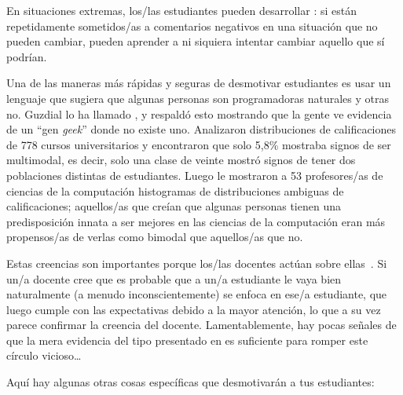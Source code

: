 En situaciones extremas,
los/las estudiantes pueden desarrollar :
si están repetidamente sometidos/as a comentarios negativos en una situación que no pueden cambiar,
pueden aprender a ni siquiera intentar cambiar aquello que sí podrían.

Una de las maneras más rápidas y seguras de desmotivar estudiantes es
usar un lenguaje que sugiera que algunas personas son programadoras naturales y otras no.
Guzdial lo ha llamado
,
y \cite{Pati2016} respaldó esto mostrando que
la gente ve evidencia de un ``gen \emph{geek}'' donde no existe uno.
Analizaron distribuciones de calificaciones de 778 cursos universitarios y encontraron que solo 5,8\% mostraba signos
de ser multimodal,
es decir, solo una clase de veinte mostró signos de tener dos poblaciones distintas de estudiantes.
Luego le mostraron a 53 profesores/as de ciencias de la computación histogramas de distribuciones ambiguas de calificaciones;
aquellos/as que creían que algunas personas tienen una predisposición innata a ser mejores en las ciencias de la computación
eran más propensos/as de verlas como bimodal que aquellos/as que no.

Estas creencias son importantes porque los/las docentes actúan sobre ellas~\cite{Brop1983}.
Si un/a docente cree que es probable que a un/a estudiante le vaya bien
naturalmente (a menudo inconscientemente) se enfoca en ese/a estudiante,
que luego cumple con las expectativas debido a la mayor atención,
lo que a su vez parece confirmar la creencia del docente.
Lamentablemente,
hay pocas señales de que la mera evidencia del tipo presentado en \cite{Pati2016}
es suficiente para romper este círculo vicioso{\ldots}

Aquí hay algunas otras cosas específicas que desmotivarán a tus estudiantes:

